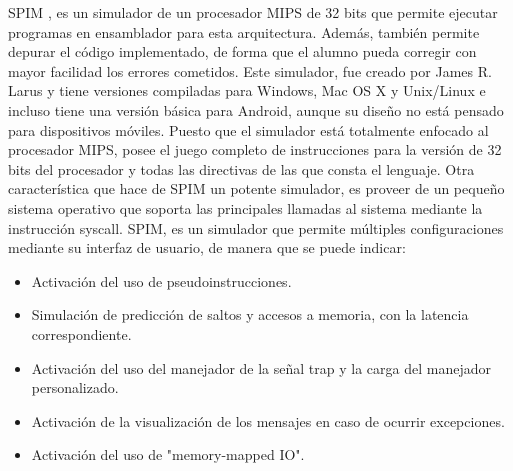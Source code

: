 SPIM \cite{larus1990spim}, es un simulador de un procesador MIPS de 32 bits que permite ejecutar programas en ensamblador para esta arquitectura. Además, también permite depurar el código implementado, de forma que el alumno pueda corregir con mayor facilidad los errores cometidos. Este simulador, fue creado por James R. Larus y tiene versiones compiladas para Windows, Mac OS X y Unix/Linux e incluso tiene una versión básica para Android, aunque su diseño no está pensado para dispositivos móviles. Puesto que el simulador está totalmente enfocado al procesador MIPS, posee el juego completo de instrucciones para la versión de 32 bits del procesador y todas las directivas de las que consta el lenguaje. Otra característica que hace de SPIM un potente simulador, es proveer de un pequeño sistema operativo que soporta las principales llamadas al sistema mediante la instrucción syscall. SPIM, es un simulador que permite múltiples configuraciones mediante su interfaz de usuario, de manera que se puede indicar:

\begin{itemize}

\item Activación del uso de pseudoinstrucciones.

\item Simulación de predicción de saltos y accesos a memoria, con la latencia correspondiente.

\item Activación del uso del manejador de la señal trap y la carga del manejador personalizado.

\item Activación de la visualización de los mensajes en caso de ocurrir excepciones.

\item Activación del uso de "memory-mapped IO".

\end{itemize}

